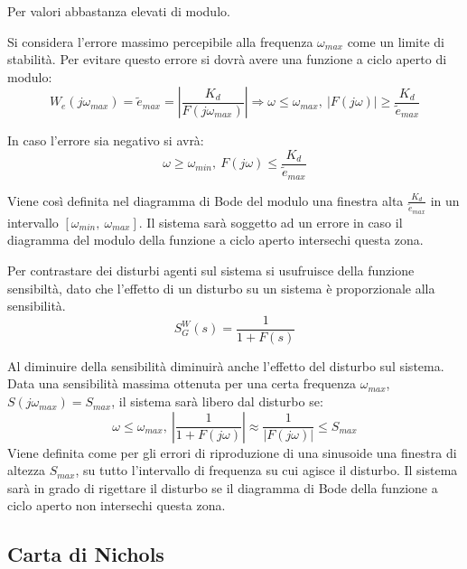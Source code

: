 \documentclass{article}
\numberwithin{equation}{subsection}
\begin{document}
Per valori abbastanza elevati di modulo.


Si considera l'errore massimo percepibile alla frequenza $\omega_{max}$ come un limite di stabilità. Per evitare questo errore si dovrà avere una funzione a ciclo aperto di 
modulo:
\begin{equation}
    W_e(j\omega_{max})=\tilde{e}_{max}=\displaystyle\left|\frac{K_d}{F(j\omega_{max})}\right|\Rightarrow \omega\leq\omega_{max},\:|F(j\omega)|\geq\frac{K_d}{\tilde{e}_{max}}
\end{equation} 

In caso l'errore sia negativo si avrà:
\begin{equation}
    \omega\geq\omega_{min},\:F(j\omega)\leq\displaystyle\frac{K_d}{\tilde{e}_{max}}
\end{equation}

Viene così definita nel diagramma di Bode del modulo una finestra alta $\displaystyle\frac{K_d}{\tilde{e}_{max}}$ in un intervallo $[\omega_{min},\:\omega_{max}]$. 
Il sistema sarà soggetto ad un errore in caso il diagramma del modulo della funzione a ciclo aperto intersechi questa zona. 

 
Per contrastare dei disturbi agenti sul sistema si usufruisce della funzione sensibiltà, dato che l'effetto di un disturbo su un sistema è proporzionale alla sensibilità. 
\begin{equation}
    S^W_G(s)=\displaystyle\frac{1}{1+F(s)}
\end{equation}

Al diminuire della sensibilità diminuirà anche l'effetto del disturbo sul sistema. Data una sensibilità massima ottenuta per una certa frequenza $\omega_{max}$, 
$S(j\omega_{max})=S_{max}$, il sistema sarà libero dal disturbo se: 
\begin{equation}
    \omega\leq\omega_{max},\:\displaystyle\left|\frac{1}{1+F(j\omega)}\right|\approx\frac{1}{|F(j\omega)|}\leq S_{max}
\end{equation}
Viene definita come per gli errori di riproduzione di una sinusoide una finestra di altezza $S_{max}$, su tutto l'intervallo di frequenza su cui agisce il disturbo. Il sistema 
sarà in grado di rigettare il disturbo se il diagramma di Bode della funzione a ciclo aperto non intersechi questa zona. 

\subsection{Carta di Nichols}
\end{document}
